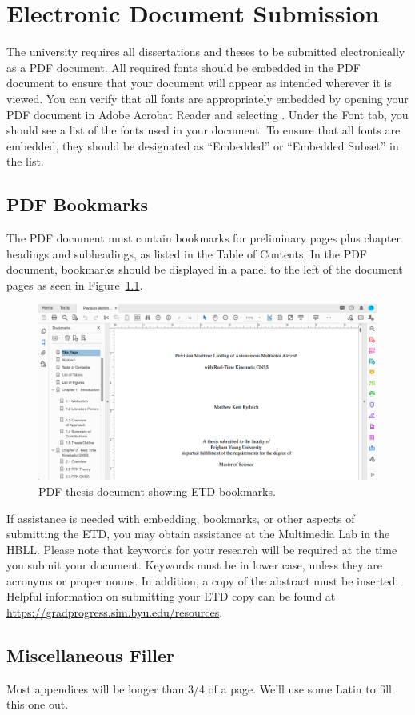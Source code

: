 \chapter{Electronic Document Submission}
\label{ap:elect_doc}

The university requires all dissertations and theses to be submitted electronically as a PDF document. All required fonts should be embedded in the PDF document to ensure that your document will appear as intended wherever it is viewed. You can verify that all fonts are appropriately embedded by opening your PDF document in Adobe Acrobat Reader and selecting {}. Under the Font tab, you should see a list of the fonts used in your document. To ensure that all fonts are embedded, they should be designated as ``Embedded'' or ``Embedded Subset'' in the list.

\section{PDF Bookmarks}
The PDF document must contain bookmarks for preliminary pages plus chapter headings and subheadings, as listed in the Table of Contents. In the PDF document, bookmarks should be displayed in a panel to the left of the document pages as seen in Figure~\ref{fig:PDF_doc}. 

\begin{figure}[htbp]
	\centering
	\includegraphics[width=4.5in]{figures/ETD_thesis}
	\caption{PDF thesis document showing ETD bookmarks.}
	\label{fig:PDF_doc}
\end{figure}

If assistance is needed with embedding, bookmarks, or other aspects of submitting the ETD, you may obtain assistance at the Multimedia Lab in the HBLL. Please note that keywords for your research will be required at the time you submit your document. Keywords must be in lower case, unless they are acronyms or proper nouns. In addition, a copy of the abstract must be inserted. Helpful information on submitting your ETD copy can be found at \url{https://gradprogress.sim.byu.edu/resources}.

\section{Miscellaneous Filler}
Most appendices will be longer than 3/4 of a page. We'll use some Latin to fill this one out. {\color{mediumgray} \blindtext}



